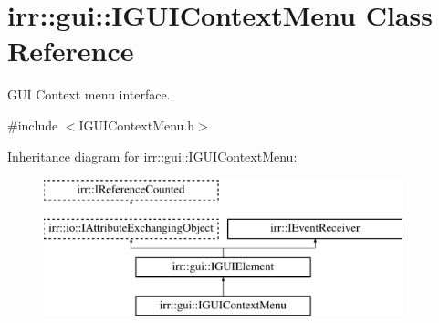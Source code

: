 \hypertarget{classirr_1_1gui_1_1IGUIContextMenu}{}\section{irr\+:\+:gui\+:\+:I\+G\+U\+I\+Context\+Menu Class Reference}
\label{classirr_1_1gui_1_1IGUIContextMenu}


G\+UI Context menu interface.  




{\ttfamily \#include $<$I\+G\+U\+I\+Context\+Menu.\+h$>$}

Inheritance diagram for irr\+:\+:gui\+:\+:I\+G\+U\+I\+Context\+Menu\+:\begin{figure}[H]
\begin{center}
\leavevmode
\includegraphics[height=4.000000cm]{classirr_1_1gui_1_1IGUIContextMenu}
\end{center}
\end{figure}
